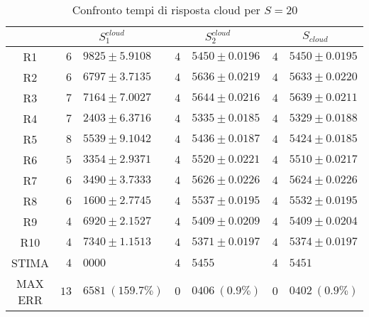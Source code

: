 \begin{table}[!h]
\begin{tabular}{c|r@{.}l|r@{.}l|r@{.}l}
& \multicolumn{2}{|c|}{$S_1^{cloud}$}
& \multicolumn{2}{|c|}{$S_2^{cloud}$}
& \multicolumn{2}{|c}{$S_{cloud}$} 
\\          
\hline
R1      & $6$&$9825 \pm 5.9108$ & $4$&$5450 \pm 0.0196$ & $4$&$5450 \pm 0.0195$ \\
R2      & $6$&$6797 \pm 3.7135$ & $4$&$5636 \pm 0.0219$ & $4$&$5633 \pm 0.0220$ \\
R3      & $7$&$7164 \pm 7.0027$ & $4$&$5644 \pm 0.0216$ & $4$&$5639 \pm 0.0211$ \\
R4      & $7$&$2403 \pm 6.3716$ & $4$&$5335 \pm 0.0185$ & $4$&$5329 \pm 0.0188$ \\
R5      & $8$&$5539 \pm 9.1042$ & $4$&$5436 \pm 0.0187$ & $4$&$5424 \pm 0.0185$ \\
R6      & $5$&$3354 \pm 2.9371$ & $4$&$5520 \pm 0.0221$ & $4$&$5510 \pm 0.0217$ \\
R7      & $6$&$3490 \pm 3.7333$ & $4$&$5626 \pm 0.0226$ & $4$&$5624 \pm 0.0226$ \\
R8      & $6$&$1600 \pm 2.7745$ & $4$&$5537 \pm 0.0195$ & $4$&$5532 \pm 0.0195$ \\
R9      & $4$&$6920 \pm 2.1527$ & $4$&$5409 \pm 0.0209$ & $4$&$5409 \pm 0.0204$ \\
R10     & $4$&$7340 \pm 1.1513$ & $4$&$5371 \pm 0.0197$ & $4$&$5374 \pm 0.0197$ \\
STIMA   & $4$&$0000$            & $4$&$5455$            & $4$&$5451$            \\
MAX ERR & $13$&$6581 \ (159.7\%)$ & $0$&$0406 \ (0.9\%)$ & $0$&$0402 \ (0.9\%)$    
\end{tabular}
\centering
\caption{Confronto tempi di risposta cloud per $S=20$}
\label{tab:20_scloud}
\end{table}
